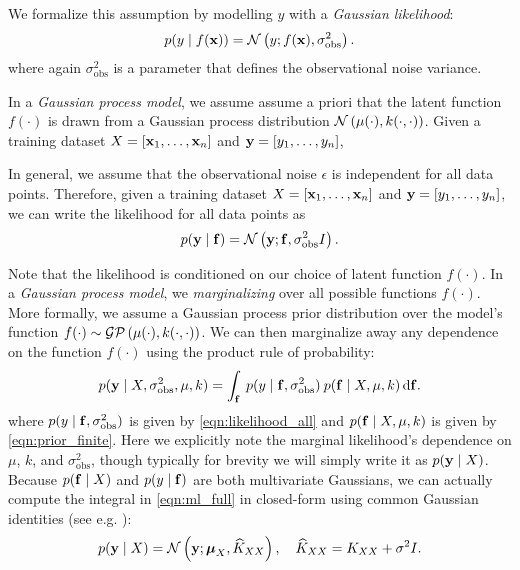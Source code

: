 We formalize this assumption by modelling $y$ with a \emph{Gaussian likelihood}:
%
\begin{equation}
  p(y \mid f(\mathbf{x})) = \mathcal{N} \left(  y; f(\mathbf{x}), \sigma^2_\text{obs} \right).
  \label{eqn:likelihood}
\end{equation}
%
where again $\sigma^2_\text{obs}$ is a parameter that defines the observational noise variance.

In a \emph{Gaussian process model}, we assume assume a priori that the latent function $f(\cdot)$ is drawn from a Gaussian process distribution $\mathcal{N} \left( \mu(\cdot), k(\cdot, \cdot) \right)$.
Given a training dataset $X = [\mathbf{x}_1, \ldots, \mathbf{x}_n]$ and $\mathbf{y} = [y_1, \ldots, y_n]$,


In general, we assume that the observational noise $\epsilon$ is independent for all data points.
Therefore, given a training dataset $X = [\mathbf{x}_1, \ldots, \mathbf{x}_n]$ and $\mathbf{y} = [y_1, \ldots, y_n]$, we can write the likelihood for all data points as
%
\begin{equation}
  p(\mathbf{y} \mid \mathbf{f}) = \mathcal{N} \left(  \mathbf{y}; \mathbf{f}, \sigma^2_\text{obs} I \right).
  \label{eqn:likelihood_all}
\end{equation}

Note that the likelihood is conditioned on our choice of latent function $f(\cdot)$.
In a \emph{Gaussian process model}, we \emph{marginalizing} over all possible functions $f(\cdot)$.
More formally, we assume a Gaussian process prior distribution over the model's function $f(\cdot) \sim \mathcal{GP} \left( \mu(\cdot), k(\cdot, \cdot) \right)$.
We can then marginalize away any dependence on the function $f(\cdot)$ using the product rule of probability:
%
\begin{equation}
  p( \mathbf{y} \mid X, \sigma^2_\text{obs}, \mu, k ) = \int_{\mathbf{f}} \: p( y \mid \mathbf{f}, \sigma^2_\text{obs} ) \: p( \mathbf{f} \mid X, \mu, k ) \,\mathrm{d}{\mathbf{f}}.
  \label{eqn:ml_full}
\end{equation}
%
where $p( y \mid \mathbf{f}, \sigma^2_\text{obs})$ is given by \autoref{eqn:likelihood_all} and $p( \mathbf{f} \mid X, \mu, k )$ is given by \autoref{eqn:prior_finite}.
Here we explicitly note the marginal likelihood's dependence on $\mu$, $k$, and $\sigma^2_\text{obs}$, though typically for brevity we will simply write it as $p(\mathbf{y} \mid X)$.
Because $p( \mathbf{f} \mid X)$ and $p( y \mid \mathbf{f})$ are both multivariate Gaussians, we can actually compute the integral in \autoref{eqn:ml_full} in closed-form using common Gaussian identities (see e.g. \cite{bishop2006pattern,rasmussen2006gaussian}):
%
\begin{equation}
  p( \mathbf{y} \mid X) = \mathcal{N} \left(  \mathbf{y}; \boldsymbol{\mu}_{X}, \widehat{K}_{XX} \right), \quad
  \widehat{K}_{XX} = K_{XX} + \sigma^2 I.
  \label{eqn:ml_exact}
\end{equation}

